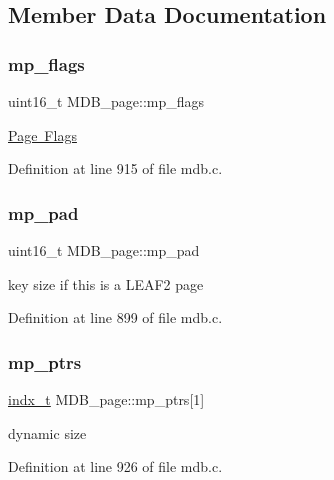 \subsection{Member Data Documentation}
\mbox{\label{struct_m_d_b__page_a851621a8c9f179faf4bdb82eb3b65e1e}} 
\subsubsection{\texorpdfstring{mp\+\_\+flags}{mp\_flags}}
{\footnotesize\ttfamily uint16\+\_\+t M\+D\+B\+\_\+page\+::mp\+\_\+flags}

\mbox{\hyperlink{group__mdb__page}{Page Flags}} 

Definition at line 915 of file mdb.\+c.

\mbox{\label{struct_m_d_b__page_a02eb008ff64ead97bfacccf6f154f7fe}} 
\subsubsection{\texorpdfstring{mp\+\_\+pad}{mp\_pad}}
{\footnotesize\ttfamily uint16\+\_\+t M\+D\+B\+\_\+page\+::mp\+\_\+pad}

key size if this is a L\+E\+A\+F2 page 

Definition at line 899 of file mdb.\+c.

\mbox{\label{struct_m_d_b__page_ae0e2d177c6a934322ef3736875d70caf}} 
\subsubsection{\texorpdfstring{mp\+\_\+ptrs}{mp\_ptrs}}
{\footnotesize\ttfamily \mbox{\hyperlink{group__internal_ga730e17f748208d77496ebd895c8375dc}{indx\+\_\+t}} M\+D\+B\+\_\+page\+::mp\+\_\+ptrs\mbox{[}1\mbox{]}}

dynamic size 

Definition at line 926 of file mdb.\+c.

\mbox{\label{struct_m_d_b__page_a8e6bf1e38b724bd6087da61bd3d35858}} 

